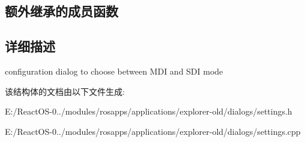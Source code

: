 \subsection*{额外继承的成员函数}


\subsection{详细描述}
configuration dialog to choose between M\+DI and S\+DI mode 

该结构体的文档由以下文件生成\+:\begin{DoxyCompactItemize}
\item 
E\+:/\+React\+O\+S-\/0../modules/rosapps/applications/explorer-\/old/dialogs/settings.\+h\item 
E\+:/\+React\+O\+S-\/0../modules/rosapps/applications/explorer-\/old/dialogs/settings.\+cpp\end{DoxyCompactItemize}
